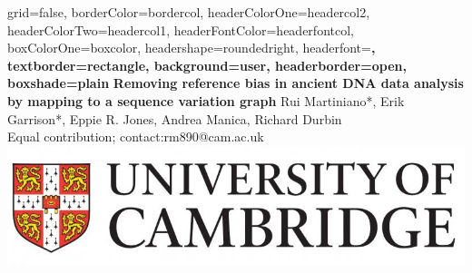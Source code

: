 \documentclass[a0paper,portrait]{baposter}
\begin{document}
\begin{poster}{
grid=false,
borderColor=bordercol, %
headerColorOne=headercol2, %
headerColorTwo=headercol1, %
headerFontColor=headerfontcol, %
boxColorOne=boxcolor, %
headershape=roundedright, %
headerfont=\Large\sf\bf, %
textborder=rectangle,
background=user,
headerborder=open, %
boxshade=plain
}
{}
%
%
{\bf Removing reference bias in ancient DNA data analysis by mapping to a sequence variation graph} %
{\vspace{1em} Rui Martiniano*, Erik Garrison*, Eppie R. Jones, Andrea Manica, Richard Durbin\\ %
{\smaller *Equal contribution; contact:rm890@cam.ac.uk}\\


} %
{\includegraphics[scale=0.125]{logo}} %







\end{poster}
\end{document}
